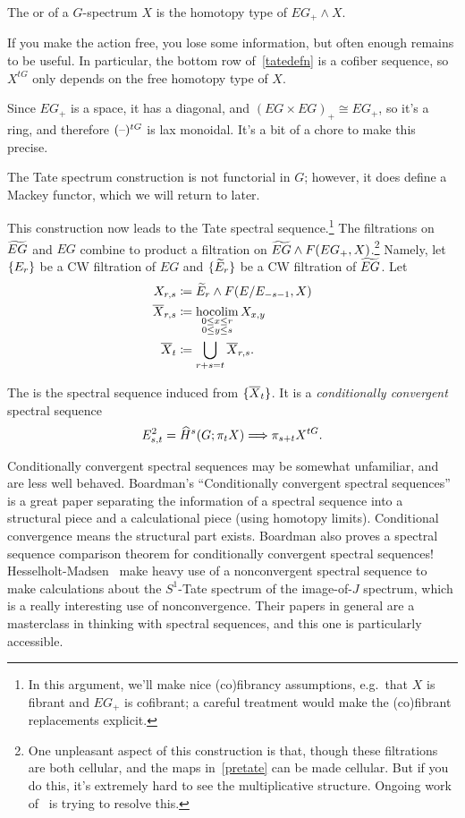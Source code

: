 \begin{defn}
The  or  of a $G$-spectrum $X$ is the homotopy type of
$EG_+\wedge X$.
\end{defn}
If you make the action free, you lose some information, but often enough remains to be useful. In particular, the
bottom row of~\eqref{tatedefn} is a cofiber sequence, so $X^{tG}$ only depends on the free homotopy type of $X$.
\begin{rem}
Since $EG_+$ is a space, it has a diagonal, and $(EG\times EG)_+\cong EG_+$, so it's a ring, and therefore
$(\text{--})^{tG}$ is lax monoidal. It's a bit of a chore to make this precise.

The Tate spectrum construction is not functorial in $G$; however, it does define a Mackey functor, which we will
return to later.
\end{rem}
This construction now leads to the Tate spectral sequence.\footnote{In this argument, we'll make nice (co)fibrancy
assumptions, e.g.\ that $X$ is fibrant and $EG_+$ is cofibrant; a careful treatment would make the (co)fibrant
replacements explicit.} The filtrations on $\widetilde{EG}$ and $EG$ combine to product a filtration on $\widetilde{EG}\wedge F(EG_+,
X)$.\footnote{One unpleasant aspect of this construction is that, though these filtrations are both cellular, and
the maps in~\eqref{pretate} can be made cellular. But if you do this, it's extremely hard to see the multiplicative
structure. Ongoing work of~ is trying to resolve this.} Namely, let $\{E_r\}$ be a CW
filtration of $EG$ and $\{\widetilde E_r\}$ be a CW filtration of $\widetilde{EG}$. Let
\begin{align*}
	X_{r,s} &\coloneqq \widetilde E_r\wedge F(E/E_{-s-1}, X)\\
	\overline X_{r,s} &\coloneqq \operatorname*{hocolim}_{\substack{0\le x\le r\\0\le y\le s}} X_{x,y}\\
	\overline X_t &\coloneqq \bigcup_{r+s=t} \overline X_{r,s}.
\end{align*}
\begin{defn}
The  is the spectral sequence induced from $\{\overline X_t\}$. It is a
\emph{conditionally convergent} spectral sequence
\[E_{s,t}^2 = \widehat H^s(G; \pi_tX)\Longrightarrow \pi_{s+t}X^{tG}.\]
\end{defn}
\begin{rem}
Conditionally convergent spectral sequences may be somewhat unfamiliar, and are less well behaved.  Boardman's
``Conditionally convergent spectral sequences''~\cite{BoardmanCCSS} is a great paper separating the information of
a spectral sequence into a structural piece and a calculational piece (using homotopy limits). Conditional
convergence means the structural part exists. Boardman also proves a spectral sequence comparison theorem for
conditionally convergent spectral sequences! Hesselholt-Madsen~\cite{HM92} make heavy use of a nonconvergent
spectral sequence to make calculations about the $S^1$-Tate spectrum of the image-of-$J$ spectrum, which is a
really interesting use of nonconvergence. Their papers in general are a masterclass in thinking with spectral
sequences, and this one is particularly accessible.
\end{rem}
